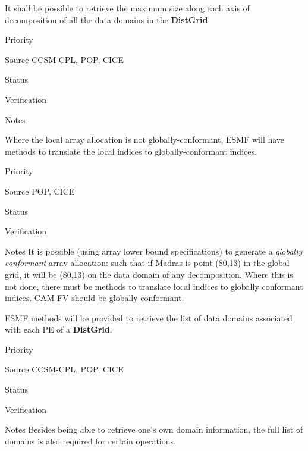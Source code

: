 
It shall be possible to retrieve the maximum size along each axis of
decomposition of all the data domains in the \textbf{DistGrid}. 

\begin{reqlist}
\item[Priority]
\item[Source] CCSM-CPL, POP, CICE
\item[Status]
\item[Verification]
\item[Notes]
\end{reqlist}


Where the local array allocation is not globally-conformant, 
ESMF will have methods to translate the local indices to
globally-conformant indices.

\begin{reqlist}
\item[Priority]
\item[Source] POP, CICE 
\item[Status]
\item[Verification]
\item[Notes] It is possible (using array lower bound specifications)
  to generate a \emph{globally conformant} array allocation: such that
  if Madras is point (80,13) in the global grid, it will be (80,13) on
  the data domain of any decomposition. Where this is not done, there
  must be methods to translate local indices to globally conformant
  indices.  CAM-FV should be globally conformant.
\end{reqlist}


ESMF methods will be provided to retrieve the list of data
domains associated with each PE of a  \textbf{DistGrid}.

\begin{reqlist}
\item[Priority]
\item[Source] CCSM-CPL, POP, CICE
\item[Status]
\item[Verification]
\item[Notes] Besides being able to retrieve one's own domain
  information, the full list of domains is also required for certain
  operations.
\end{reqlist}

